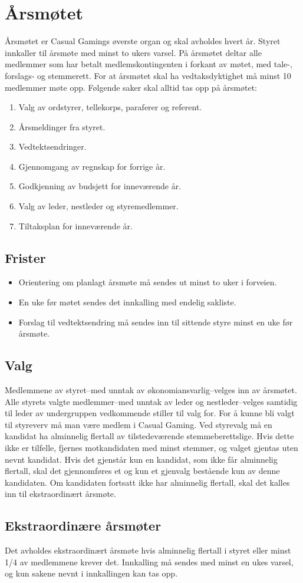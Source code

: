 \chapter{Årsmøtet}
Årsmøtet er Casual Gamings øverste organ og skal avholdes hvert år. Styret innkaller til årsmøte med minst to ukers varsel. På årsmøtet deltar alle medlemmer som har betalt medlemskontingenten i forkant av møtet, med tale-, forslags‐ og stemmerett. For at årsmøtet skal ha vedtaksdyktighet må minst 10 medlemmer møte opp. Følgende saker skal alltid tas opp på årsmøtet:
\begin{enumerate}
    \item Valg av ordstyrer, tellekorps, paraferer og referent.
    \item Årsmeldinger fra styret.
    \item Vedtektsendringer.
    \item Gjennomgang av regnskap for forrige år.
    \item Godkjenning av budsjett for inneværende år.
    \item Valg av leder, nestleder og styremedlemmer.
    \item Tiltaksplan for inneværende år.
\end{enumerate}

\section{Frister}
\begin{itemize}
    \item Orientering om planlagt årsmøte må sendes ut minst to uker i forveien.
    \item En uke før møtet sendes det innkalling med endelig sakliste.
    \item Forslag til vedtektsendring må sendes inn til sittende styre minst en uke før årsmøte.
\end{itemize}

\section{Valg}
Medlemmene av styret–med unntak av økonomiansvarlig–velges inn av årsmøtet. Alle styrets valgte medlemmer–med unntak av leder og nestleder–velges samtidig til leder av undergruppen vedkommende stiller til valg for. For å kunne bli valgt til styreverv må man være medlem i Casual Gaming. Ved styrevalg må en kandidat ha alminnelig flertall av tilstedeværende stemmeberettslige. Hvis dette ikke er tilfelle, fjernes motkandidaten med minst stemmer, og valget gjentas uten nevnt kandidat. Hvis det gjenstår kun en kandidat, som ikke får alminnelig flertall, skal det gjennomføres et og kun et gjenvalg bestående kun av denne kandidaten. Om kandidaten fortsatt ikke har alminnelig flertall, skal det kalles inn til ekstraordinært årsmøte.

\section{Ekstraordinære årsmøter}
Det avholdes ekstraordinært årsmøte hvis alminnelig flertall i styret eller minst 1/4 av medlemmene krever det. Innkalling må sendes med minst en ukes varsel, og kun sakene nevnt i innkallingen kan tas opp.
